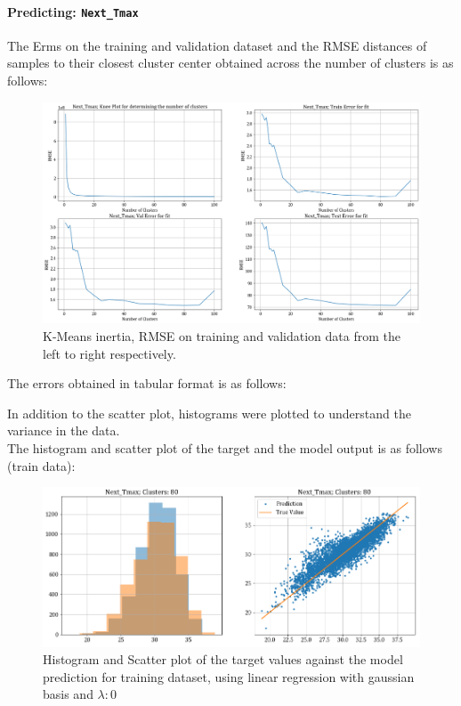 \documentclass[12pt,a4paper]{article}
\newcommand{\noi}{\noindent}
\def\tt#1{\texttt{#1}}
\begin{document}
\paragraph{Predicting: \tt{Next\_Tmax}}
The Erms on the training and validation dataset and the RMSE distances of samples to their closest cluster center obtained across the number of clusters is as follows:
\begin{figure}[H]
     \centering
     \includegraphics[scale=0.4]{images/t3_d3/no_reg/tmax_errors.png}
     \caption{K-Means inertia, RMSE on training and validation data from the left to right respectively.}
\end{figure}

\vspace{-1em}
The errors obtained in tabular format is as follows:


\noi
In addition to the scatter plot, histograms were plotted to understand the variance in the data.\\

\noi
The histogram and scatter plot of the target and the model output is as follows (train data):
\begin{figure}[H]
     \centering
     \includegraphics[scale=0.49]{images/t3_d3/no_reg/T_max_nclu_80.png}
     \caption{Histogram and Scatter plot of the target values against the model prediction for training dataset, using linear regression with gaussian basis and $\lambda: 0$}
\end{figure}
\end{document}
